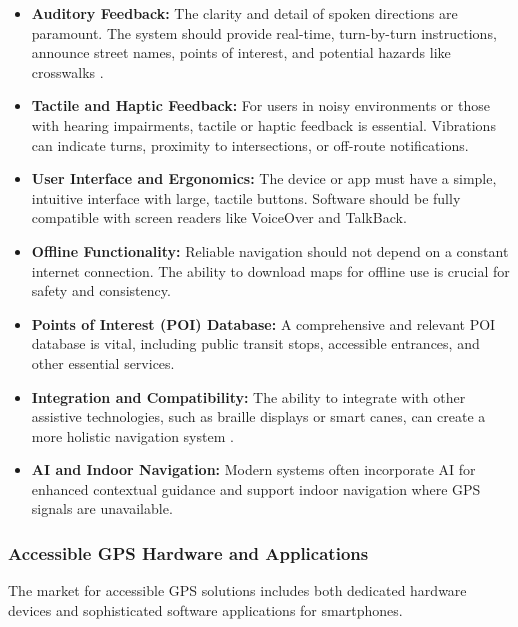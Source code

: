 \begin{itemize}
	\item \textbf{Auditory Feedback:} The clarity and detail of spoken directions are paramount. The system should provide real-time, turn-by-turn instructions, announce street names, points of interest, and potential hazards like crosswalks \supercite{InclusiveCityMaker2023, navilens}.
	\item \textbf{Tactile and Haptic Feedback:} For users in noisy environments or those with hearing impairments, tactile or haptic feedback is essential. Vibrations can indicate turns, proximity to intersections, or off-route notifications.
	\item \textbf{User Interface and Ergonomics:} The device or app must have a simple, intuitive interface with large, tactile buttons. Software should be fully compatible with screen readers like VoiceOver and TalkBack.
	\item \textbf{Offline Functionality:} Reliable navigation should not depend on a constant internet connection. The ability to download maps for offline use is crucial for safety and consistency.
	\item \textbf{Points of Interest (POI) Database:} A comprehensive and relevant POI database is vital, including public transit stops, accessible entrances, and other essential services.
	\item \textbf{Integration and Compatibility:} The ability to integrate with other assistive technologies, such as braille displays or smart canes, can create a more holistic navigation system \supercite{AFBGPS2023, WeWALK}.
	\item \textbf{AI and Indoor Navigation:} Modern systems often incorporate AI for enhanced contextual guidance and support indoor navigation where GPS signals are unavailable.\supercite{bipedai, navilens}
\end{itemize}

\subsubsection{Accessible GPS Hardware and Applications}
The market for accessible GPS solutions includes both dedicated hardware devices and sophisticated software applications for smartphones.

